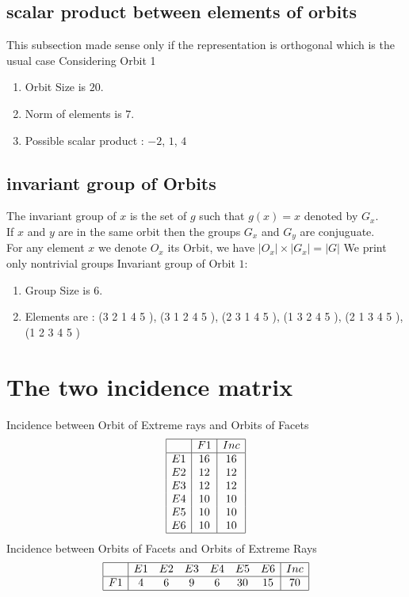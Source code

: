 \documentclass[12pt]{article}
\begin{document}
\subsection{scalar product between elements of orbits}
\noindent This subsection made sense only if the representation is orthogonal which is the usual case
Considering Orbit 1
\begin{enumerate}
\item Orbit Size is $20$.
\item Norm of elements is $7$.
\item Possible scalar product : $-2$, $1$, $4$
\end{enumerate}
\subsection{invariant group of Orbits}
\noindent The invariant group of $x$ is the set of $g$ such that $g(x)=x$ denoted by $G_x$.\\
If $x$ and $y$ are in the same orbit then the groups $G_x$ and  $G_y$ are conjuguate.\\
For any element $x$ we denote $O_x$ its Orbit, we have $|O_x|\times |G_x|=|G|$
We print only nontrivial groups
Invariant group of Orbit $1$:
\begin{enumerate}
\item Group Size is $6$.
\item Elements are : (3 2 1 4 5  ), (3 1 2 4 5  ), (2 3 1 4 5  ), (1 3 2 4 5  ), (2 1 3 4 5  ), (1 2 3 4 5  )
\end{enumerate}
\section{The two incidence matrix}
Incidence between Orbit of Extreme rays and Orbits of Facets
\begin{equation*}
\begin{array}{|c|c|c|}
\hline
&F1&Inc\\
\hline
E1&16&16\\
E2&12&12\\
E3&12&12\\
E4&10&10\\
E5&10&10\\
E6&10&10\\
\hline
\end{array}
\end{equation*}
Incidence between Orbits of Facets and Orbits of Extreme Rays
\begin{equation*}
\begin{array}{|c|cccccc|c|}
\hline
&E1&E2&E3&E4&E5&E6&Inc\\
\hline
F1&4&6&9&6&30&15&70\\
\hline
\end{array}
\end{equation*}
\end{document}
